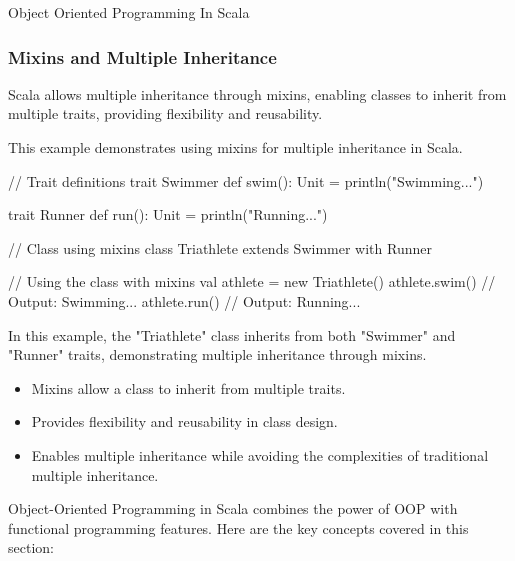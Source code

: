 \begin{notes}{Object Oriented Programming In Scala}
\begin{highlight}
    \end{highlight}
    
    \subsubsection*{Mixins and Multiple Inheritance}
    
    Scala allows multiple inheritance through mixins, enabling classes to inherit from multiple traits, providing flexibility and reusability.
    
    \begin{highlight}
    
        This example demonstrates using mixins for multiple inheritance in Scala.
    
    \begin{code}[Scala]
    // Trait definitions
    trait Swimmer {
        def swim(): Unit = println("Swimming...")
    }
    
    trait Runner {
        def run(): Unit = println("Running...")
    }
    
    // Class using mixins
    class Triathlete extends Swimmer with Runner
    
    // Using the class with mixins
    val athlete = new Triathlete()
    athlete.swim()  // Output: Swimming...
    athlete.run()   // Output: Running...
    \end{code}
    
        In this example, the "Triathlete" class inherits from both "Swimmer" and "Runner" traits, demonstrating multiple inheritance through mixins.
    
        \begin{itemize}
            \item Mixins allow a class to inherit from multiple traits.
            \item Provides flexibility and reusability in class design.
            \item Enables multiple inheritance while avoiding the complexities of traditional multiple inheritance.
        \end{itemize}
    
    \end{highlight}
    
    \begin{highlight}
    
        Object-Oriented Programming in Scala combines the power of OOP with functional programming features. Here are the key concepts covered in this section:
    

\end{highlight}
\end{notes}
